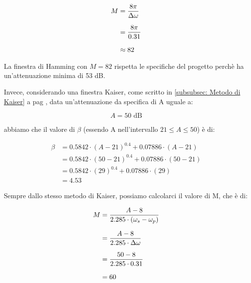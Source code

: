 {
    \Large 
    \begin{equation}
        \setlength{\jot}{10pt} %
        \begin{split}
            M 
            &= \dfrac{8 \pi}{\Delta \omega} 
            \\
            &= \dfrac{8 \pi}{0.31} 
            \\
            &\approx 82  
        \end{split} 
    \end{equation}
}

La finestra di Hamming con $M = 82$ rispetta le specifiche del progetto perchè ha un'attenuazione minima di 53 dB. \newline 

Invece, considerando una finestra Kaiser, come scritto in \ref{subsubsec: Metodo di Kaiser}  a pag \pageref{subsubsec: Metodo di Kaiser}, 
data un'attenuazione da specifica di A uguale a: 

{
    \Large 
    \begin{equation}
        A = 50 \text{ dB}
    \end{equation}
}

abbiamo che il valore di $\beta$ (essendo A nell'intervallo $21 \leq A \leq 50$) è di: 

{
    \Large 
    \begin{equation}
        \begin{split}
            \beta 
            &= 
            0.5842 \cdot \left(A - 21\right)^{0.4} + 0.07886 \cdot \left( A - 21\right) 
            \\
            &= 
            0.5842 \cdot \left(50 - 21\right)^{0.4} + 0.07886 \cdot \left( 50 - 21\right) 
            \\
            &= 
            0.5842 \cdot \left(29\right)^{0.4} + 0.07886 \cdot \left( 29\right) 
            \\
            &= 
            4.53
        \end{split}
    \end{equation}
}

Sempre dallo stesso metodo di Kaiser, possiamo calcolarci il valore di M, che è di: 

{
    \Large 
    \begin{equation} 
        \setlength{\jot}{10pt} %
        \begin{split}
        M 
        &= 
        \dfrac{A - 8}{2.285 \cdot \left(\omega_s - \omega_p\right)} 
        \\
        &= 
        \dfrac{A - 8}{2.285 \cdot \Delta \omega} 
        \\ 
        &= 
        \dfrac{50 - 8}{2.285 \cdot 0.31} 
        \\
        &= 
        60  
        \end{split}
    \end{equation}
} 

